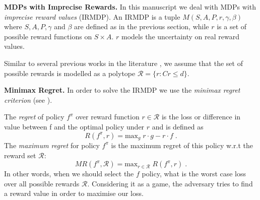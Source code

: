 \documentclass[sigconf]{aamas}  %
\begin{document}
\textbf{MDPs with Imprecise Rewards.}  
In this manuscript we deal with 
MDPs with \textit{imprecise reward values} (IRMDP). An IRMDP \citep{Regan2009} is a tuple $M(S, A, P, r, \gamma, \beta)$ where $S, A, P, \gamma$ and $\beta$ are defined as in the previous section, while $r$ is a set of possible reward functions on $S \times A$. $r$ models the uncertainty on real reward values. 

Similar to several previous works in the literature \cite{Ahmed2017,alizadeh2015,benavent2018,Regan2009,Weng2013}, we assume that the set of possible rewards is modelled as a polytope $\mathcal{R} = \{r: Cr \leq d \}$. %
 

\textbf{Minimax Regret.}  
In order to solve the IRMDP we use the \textit{minimax regret criterion} (see \cite{Regan2009,Xu2009}). 

The \textit{regret} of policy $f^{\pi}$ 
over reward function $r \in \mathcal{R}$ is the loss or difference in value between f and the optimal policy under $r$ and is defined as 
$$R(f^{\pi}, r) = \text{max}_{g} \; r \cdot g - r \cdot f\;.$$
The \textit{maximum regret} for policy $f^{\pi}$ is the maximum regret of this policy w.r.t the reward set 
$\mathcal{R}$: $$MR(f^{\pi}, \mathcal{R}) = \text{max}_{r \in \mathcal{R}}\;R(f^{\pi},r)\;.$$ 
In other words, when we should select the $f$ policy, what is the worst case loss over all possible rewards $\mathcal{R}$. Considering it as a game, the adversary tries to find a reward value in order to maximise our loss.  
\end{document}
